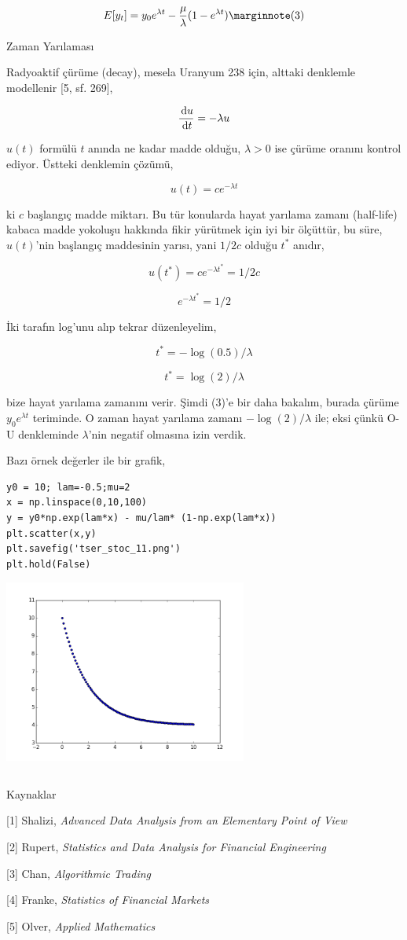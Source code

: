 \documentclass[12pt,fleqn]{article}\usepackage{../../common}
\begin{document}
$$ 
E[y_t] = y_0 e^{\lambda t} - \frac{\mu}{\lambda} ( 1 - e^{\lambda t}) 
\mlabel{3}
$$

Zaman Yarılaması

Radyoaktif çürüme (decay), mesela Uranyum 238 için, alttaki denklemle
modellenir [5, sf. 269],

$$ \frac{\,\mathrm{d} u}{\,\mathrm{d} t} = - \lambda u$$

$u(t)$ formülü $t$ anında ne kadar madde olduğu, $\lambda > 0$ ise çürüme
oranını kontrol ediyor. Üstteki denklemin çözümü,

$$ u(t) = c e^{-\lambda t} $$

ki $c$ başlangıç madde miktarı. Bu tür konularda hayat yarılama zamanı
(half-life) kabaca madde yokoluşu hakkında fikir yürütmek için iyi bir ölçüttür,
bu süre, $u(t)$'nin başlangıç maddesinin yarısı, yani $1/2 c$ olduğu $t^*$
anıdır,


$$ u(t^*) = c e^{-\lambda t^*} = 1/2 c$$

$$  e^{-\lambda t^*} = 1/2 $$

İki tarafın log'unu alıp tekrar düzenleyelim,

$$ t^* = -\log(0.5)/\lambda $$

$$ t^* = \log(2)/\lambda $$

bize hayat yarılama zamanını verir. Şimdi (3)'e bir daha bakalım, burada çürüme
$y_0 e^{\lambda t}$ teriminde. O zaman hayat yarılama zamanı $-\log(2)/\lambda$
ile; eksi çünkü O-U denkleminde $\lambda$'nin negatif olmasına izin verdik.

Bazı örnek değerler ile bir grafik,

\begin{verbatim}
y0 = 10; lam=-0.5;mu=2
x = np.linspace(0,10,100)
y = y0*np.exp(lam*x) - mu/lam* (1-np.exp(lam*x))
plt.scatter(x,y)
plt.savefig('tser_stoc_11.png')
plt.hold(False)
\end{verbatim}

\includegraphics[height=6cm]{tser_stoc_11.png}

\inputminted[fontsize=\footnotesize]{python}{halflife.py}

Kaynaklar 

[1] Shalizi, {\em Advanced Data Analysis from an Elementary Point of View}

[2] Rupert, {\em Statistics and Data Analysis for Financial Engineering}

[3] Chan, {\em Algorithmic Trading}

[4] Franke, {\em Statistics of Financial Markets}

[5] Olver, {\em Applied Mathematics}
\end{document}
